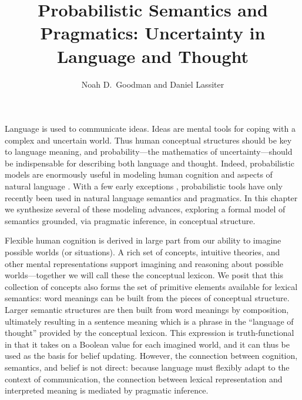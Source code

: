 \documentclass[pdfextras]{handbook}
\begin{document}

\title*{Probabilistic Semantics and Pragmatics: Uncertainty in Language and Thought}


\author{Noah D.~Goodman
        and Daniel Lassiter}



\maketitle




\tableofcontents
\pagebreak
\listoftodos
\pagebreak


Language is used to communicate ideas. Ideas are mental tools for coping with a complex and uncertain world. Thus human conceptual structures should be key to language meaning, and probability---the mathematics of uncertainty---should be indispensable for describing both language and thought. Indeed, probabilistic models are enormously useful in modeling human cognition \citep{tenenbaumetal11}
and aspects of natural language \citep{bodetal03,chater06}. With a few early exceptions \citep[e.g.][]{adams75,cohen99b}, probabilistic tools have only recently been used in natural language semantics and pragmatics. In this chapter we synthesize several of these modeling advances, exploring a formal model of semantics grounded, via pragmatic inference, in conceptual structure.

Flexible human cognition is derived in large part from our ability to imagine possible worlds (or situations). 
A rich set of concepts, intuitive theories, and other mental representations support imagining and reasoning about possible worlds---together we will call these the conceptual lexicon. 
We posit that this collection of concepts also forms the set of primitive elements available for lexical semantics: word meanings can be built from the pieces of conceptual structure. Larger semantic structures are then built from word meanings by composition, ultimately resulting in a sentence meaning which is a phrase in the ``language of thought'' provided by the conceptual lexicon. This expression is truth-functional in that it takes on a Boolean value for each imagined world, and it can thus be used as the basis for belief updating.
However, the connection between cognition, semantics, and belief is not direct: 
because language must flexibly adapt to the context of communication, the connection between lexical representation and interpreted meaning is mediated by pragmatic inference.
\end{document}
